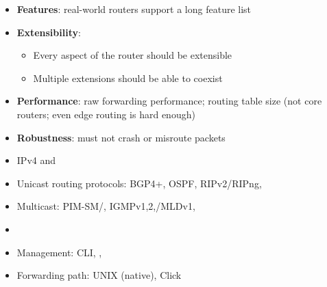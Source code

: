\documentclass[landscape]{icsislides}
\begin{document}
\begin{slide}

\begin{itemize}

  \item {\bf Features}: real-world routers support a long feature list

  \item {\bf Extensibility}:
  \begin{itemize}
    \item Every aspect of the router should be extensible
    \item Multiple extensions should be able to coexist
  \end{itemize}

  \item {\bf Performance}: raw forwarding performance; routing table size (not
  core routers; even edge routing is hard enough)

  \item {\bf Robustness}: must not crash or misroute packets

\end{itemize}

\end{slide}

\begin{slide}

\begin{itemize}

  \item IPv4 and 

  \item Unicast routing protocols: BGP4+, OSPF, RIPv2/RIPng, 

  \item Multicast: PIM-SM/, IGMPv1,2,/MLDv1,

  \item {}

  \item Management: CLI, , 

  \item Forwarding path: UNIX (native), Click

\end{itemize}

\end{slide}
\end{document}
